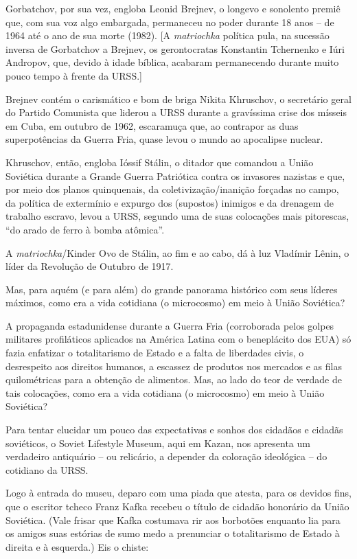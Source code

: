 Gorbatchov, por sua vez, engloba Leonid Brejnev, o longevo e sonolento
premiê que, com sua voz algo embargada, permaneceu no poder durante 18
anos -- de 1964 até o ano de sua morte (1982). {[}A \emph{matriochka}
política pula, na sucessão inversa de Gorbatchov a Brejnev, os
gerontocratas Konstantin Tchernenko e Iúri Andropov, que, devido à idade
bíblica, acabaram permanecendo durante muito pouco tempo à frente da
URSS.{]}

Brejnev contém o carismático e bom de briga Nikita Khruschov, o
secretário geral do Partido Comunista que liderou a URSS durante a
gravíssima crise dos mísseis em Cuba, em outubro de 1962, escaramuça
que, ao contrapor as duas superpotências da Guerra Fria, quase levou o
mundo ao apocalipse nuclear.

Khruschov, então, engloba Ióssif Stálin, o ditador que comandou a União
Soviética durante a Grande Guerra Patriótica contra os invasores
nazistas e que, por meio dos planos quinquenais, da
coletivização/inanição forçadas no campo, da política de extermínio e
expurgo dos (supostos) inimigos e da drenagem de trabalho escravo, levou
a URSS, segundo uma de suas colocações mais pitorescas, ``do arado de
ferro à bomba atômica''.

A \emph{matriochka}/Kinder Ovo de Stálin, ao fim e ao cabo, dá à luz
Vladímir Lênin, o líder da Revolução de Outubro de 1917.

Mas, para aquém (e para além) do grande panorama histórico com seus
líderes máximos, como era a vida cotidiana (o microcosmo) em meio à
União Soviética?

A propaganda estadunidense durante a Guerra Fria (corroborada pelos
golpes militares profiláticos aplicados na América Latina com o
beneplácito dos EUA) só fazia enfatizar o totalitarismo de Estado e a
falta de liberdades civis, o desrespeito aos direitos humanos, a
escassez de produtos nos mercados e as filas quilométricas para a
obtenção de alimentos. Mas, ao lado do teor de verdade de tais
colocações, como era a vida cotidiana (o microcosmo) em meio à União
Soviética?

Para tentar elucidar um pouco das expectativas e sonhos dos cidadãos e
cidadãs soviéticos, o Soviet Lifestyle Museum, aqui em Kazan, nos
apresenta um verdadeiro antiquário -- ou relicário, a depender da
coloração ideológica -- do cotidiano da URSS.

Logo à entrada do museu, deparo com uma piada que atesta, para os
devidos fins, que o escritor tcheco Franz Kafka recebeu o título de
cidadão honorário da União Soviética. (Vale frisar que Kafka costumava
rir aos borbotões enquanto lia para os amigos suas estórias de sumo medo
a prenunciar o totalitarismo de Estado à direita e à esquerda.) Eis o
chiste:

